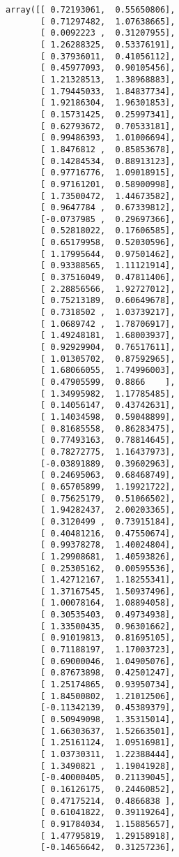 \documentclass[a4paper,10pt]{article}
\begin{document}
\begin{verbatim}
array([[ 0.72193061,  0.55650806],
       [ 0.71297482,  1.07638665],
       [ 0.0092223 ,  0.31207955],
       [ 1.26288325,  0.53376191],
       [ 0.37936011,  0.41056112],
       [ 0.45977093,  0.90105456],
       [ 1.21328513,  1.38968883],
       [ 1.79445033,  1.84837734],
       [ 1.92186304,  1.96301853],
       [ 0.15731425,  0.25997341],
       [ 0.62793672,  0.70533181],
       [ 0.99486393,  1.01006694],
       [ 1.8476812 ,  0.85853678],
       [ 0.14284534,  0.88913123],
       [ 0.97716776,  1.09018915],
       [ 0.97161201,  0.58900998],
       [ 1.73500472,  1.44673582],
       [ 0.9647784 ,  0.67339812],
       [-0.0737985 ,  0.29697366],
       [ 0.52818022,  0.17606585],
       [ 0.65179958,  0.52030596],
       [ 1.17995644,  0.97501462],
       [ 0.93388565,  1.11121914],
       [ 0.37516049,  0.47811406],
       [ 2.28856566,  1.92727012],
       [ 0.75213189,  0.60649678],
       [ 0.7318502 ,  1.03739217],
       [ 1.0689742 ,  1.78706917],
       [ 1.49248181,  1.68003937],
       [ 0.92929904,  0.76517611],
       [ 1.01305702,  0.87592965],
       [ 1.68066055,  1.74996003],
       [ 0.47905599,  0.8866    ],
       [ 1.34995982,  1.17785485],
       [ 0.14056147,  0.43742631],
       [ 1.14034598,  0.59048899],
       [ 0.81685558,  0.86283475],
       [ 0.77493163,  0.78814645],
       [ 0.78272775,  1.16437973],
       [-0.03891889,  0.39602963],
       [ 0.24695063,  0.68468749],
       [ 0.65705899,  1.19921722],
       [ 0.75625179,  0.51066502],
       [ 1.94282437,  2.00203365],
       [ 0.3120499 ,  0.73915184],
       [ 0.40481216,  0.47550674],
       [ 0.99378278,  1.40024804],
       [ 1.29908681,  1.40593826],
       [ 0.25305162,  0.00595536],
       [ 1.42712167,  1.18255341],
       [ 1.37167545,  1.50937496],
       [ 1.00078164,  1.08894058],
       [ 0.30535403,  0.49734938],
       [ 1.33500435,  0.96301662],
       [ 0.91019813,  0.81695105],
       [ 0.71188197,  1.17003723],
       [ 0.69000046,  1.04905076],
       [ 0.87673898,  0.42501247],
       [ 1.25174865,  0.93950734],
       [ 1.84500802,  1.21012506],
       [-0.11342139,  0.45389379],
       [ 0.50949098,  1.35315014],
       [ 1.66303637,  1.52663501],
       [ 1.25161124,  1.09516981],
       [ 1.03730311,  1.22388444],
       [ 1.3490821 ,  1.19041928],
       [-0.40000405,  0.21139045],
       [ 0.16126175,  0.24460852],
       [ 0.47175214,  0.4866838 ],
       [ 0.61041822,  0.39119264],
       [ 0.91784034,  1.15885657],
       [ 1.47795819,  1.29158918],
       [-0.14656642,  0.31257236],

\end{verbatim}
\end{document}
